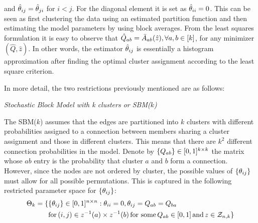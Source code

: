 \documentclass[11pt]{article}
\begin{document}
and $\hat{\theta}_{ij} = \hat{\theta}_{ji}$ for $i<j$. For the diagonal element it is set as $\hat{\theta}_{ii} = 0$. This can be seen as first clustering the data using an estimated partition function and then estimating the model parameters by using block averages. From the least squares formulation it is easy to observe that $\hat{Q}_{ab} = \bar{A}_{ab}(\hat{z}), \forall a,b \in \lbrack k\rbrack$, for any minimizer $( \hat{Q}, \hat{z} )$. In other words, the estimator $\hat{\theta}_{ij}$ is essentially a histogram approximation after finding the optimal cluster assignment according to the least square criterion.

In more detail, the two restrictions previously mentioned are as follows:

\begin{assump}\label{assump:sbm}
\textit{Stochastic Block Model with k clusters or SBM($k$)}

\noindent
The SBM($k$) assumes that the edges are partitioned into $k$ clusters with different probabilities assigned to a connection between members sharing a cluster assignment and those in different clusters. This means that there are $k^2$ different connection probabilities in the model. Denote by $\{Q_{ab}\} \in [0, 1]^{k \times k}$ the matrix whose $ab$ entry is the probability that cluster $a$ and $b$ form a connection. However, since the nodes are not ordered by cluster, the possible values of $\{\theta_{ij}\}$ must allow for all possible permutations. This is captured in the following restricted parameter space for $\{\theta_{ij}\}$:
\begin{equation}
\begin{aligned}
\Theta_k = \{&\{\theta_{ij}\} \in [0, 1]^{n \times n} : \theta_{ii} = 0, \theta_{ij} = Q_{ab} = Q_{ba}\\
    & \text{for} \, (i, j) \in z^{-1}(a) \times z^{-1}(b) \, \text{for some} \, Q_{ab} \in [0, 1] \, \text{and} \, z \in \mathcal{Z}_{n,k}\}
\end{aligned}
\end{equation}
\end{assump}
\end{document}
